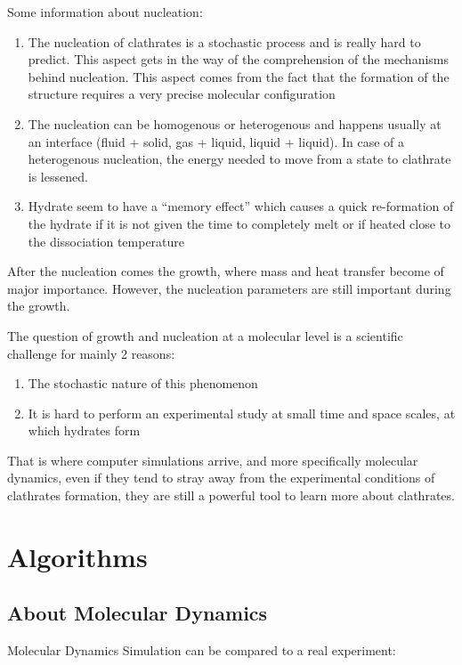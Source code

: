 Some information about nucleation:
\begin{enumerate}
    \item The nucleation of clathrates is a stochastic process and is really hard to predict. This aspect gets in the way of the comprehension of the mechanisms behind nucleation. This aspect comes from the fact that the formation of the structure requires a very precise molecular configuration
    \item The nucleation can be homogenous or heterogenous and happens usually at an interface (fluid + solid, gas + liquid, liquid + liquid). In case of a heterogenous nucleation, the energy needed to move from a state to clathrate is lessened.
    \item Hydrate seem to have a ``memory effect'' which causes a quick re-formation of the hydrate if it is not given the time to completely melt or if heated close to the dissociation temperature
\end{enumerate}
After the nucleation comes the growth, where mass and heat transfer become of major importance. However, the nucleation parameters are still important during the growth.

The question of growth and nucleation at a molecular level is a scientific challenge for mainly 2 reasons:
\begin{enumerate}
    \item The stochastic nature of this phenomenon
    \item It is hard to perform an experimental study at small time and space scales, at which hydrates form
\end{enumerate}
That is where computer simulations arrive, and more specifically molecular dynamics, even if they tend to stray away from the experimental conditions of clathrates formation, they are still a powerful tool to learn more about clathrates.


\section{Algorithms}

\subsection{About Molecular Dynamics}

Molecular Dynamics Simulation can be compared to a real experiment:


